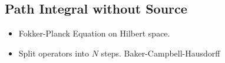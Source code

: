 \subsection{Path Integral without Source}
\begin{itemize}
  \item {Fokker-Planck Equation on Hilbert space.  }
  \item {Split operators into $N$ steps.  Baker-Campbell-Hausdorff}


\end{itemize}
